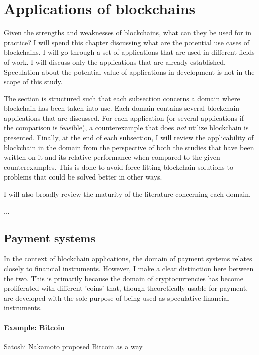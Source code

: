 \section{Applications of blockchains}

Given the strengths and weaknesses of blockchains, what can they be
used for in practice? I will spend this chapter discussing what are
the potential use cases of blockchains. I will go through a set of
applications that are used in different fields of work. I will discuss
only the applications that are already established. Speculation about
the potential value of applications in development is not in the scope
of this study. 

The section is structured such that each subsection concerns a domain
where blockchain has been taken into use. Each domain contains several
blockchain applications that are discussed. For each application (or
several applications if the comparison is feasible), a counterexample
that does \textit{not} utilize blockchain is presented.  
Finally, at the end of each subsection, I will review the
applicability of blockchain in the domain from the perspective of both
the studies that have been written on it and its relative performance
when compared to the given counterexamples. This is done to avoid
force-fitting blockchain solutions to problems that could be solved
better in other ways. 

I will also broadly review the maturity of the literature concerning
each domain.

...

\subsection{Payment systems}

In the context of blockchain applications, the domain of payment
systems relates closely to financial instruments. However, I make a
clear distinction here between the two. This is primarily because the
domain of cryptocurrencies has become proliferated with different
'coins' that, though theoretically usable for payment, are developed
with the sole purpose of being used as speculative financial
instruments. 

\paragraph{Example: Bitcoin}

Satoshi Nakamoto proposed Bitcoin as a way 

